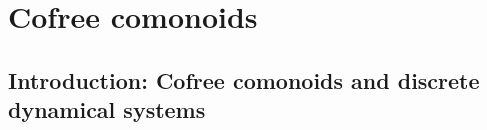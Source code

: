 \documentclass[Book-Poly]{subfiles}
\begin{document}
%
%



\section{Cofree comonoids}\label{sec.cofree}

\subsection{Introduction: Cofree comonoids and discrete dynamical systems}
\end{document}
